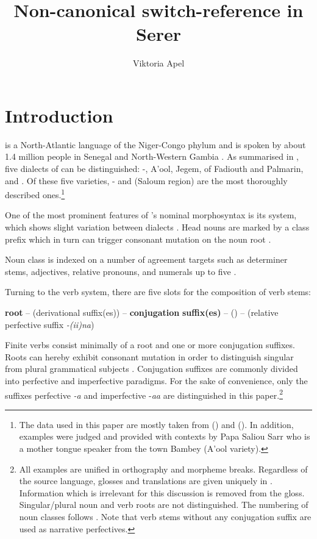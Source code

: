 \documentclass[output=paper
,newtxmath
,modfonts
,nonflat]{langsci/langscibook}
\title{Non-canonical switch-reference in Serer}
\author{Viktoria Apel\affiliation{Humboldt-Universität zu Berlin}}
\begin{document}
\maketitle

\section{Introduction}

 is a North-Atlantic language of the Niger-Congo phylum \citep{Segerer2016} and is spoken by about 1.4 million people in Senegal and North-Western Gambia \citep{SimonsFenning2017}. As summarised in \citet[4]{Renaudier2012}, five dialects of  can be distinguished: -,  A’ool,  Jegem,  of Fadiouth and Palmarin, and  . Of these five varieties, - and   (Saloum region) are the most thoroughly described ones.\footnote{The data used in this paper are mostly taken from \citet{Faye1979} () and \citet{Renaudier2012} (). In addition, examples were judged and provided with contexts by Papa Saliou Sarr who is a mother tongue speaker from the town Bambey (A’ool variety).}

One of the most prominent features of ’s nominal morphosyntax is its  system, which shows slight variation between dialects \citep[see][]{Renaudier2015}. Head nouns are marked by a class prefix which in turn can trigger consonant mutation on the noun root \citep{Faye05,McLaughlin94,McLaughlin00,Merrill14,Pozdniakov2006}.

Noun class is indexed on a number of agreement targets such as determiner stems, adjectives, relative pronouns, and numerals up to five \citep[493]{Renaudier2015}.

Turning to the verb system, there are five slots for the composition of verb stems:

\ea\label{ex:apel:1}
\glt \textbf{root} – (derivational suffix(es)) – \textbf{conjugation} \textbf{suffix(es)} –   () – (relative perfective suffix \textit{-(ii)na})
\z

Finite verbs consist minimally of a root and one or more conjugation suffixes. Roots can hereby exhibit consonant mutation in order to distinguish singular from plural grammatical subjects \citep{McLaughlin94,McLaughlin00}. Conjugation suffixes are commonly divided into perfective and imperfective paradigms. For the sake of convenience, only the suffixes perfective \textit{-a}  and imperfective -\textit{aa}  are distinguished in this paper.\footnote{All examples are unified in orthography and morpheme breaks. Regardless of the source language, glosses and translations are given uniquely in . Information which is irrelevant for this discussion is removed from the gloss. Singular/plural noun and verb roots are not distinguished. The numbering of noun classes follows \citet[118]{Faye1979}. Note that verb stems without any conjugation suffix are used as narrative perfectives.} 
\end{document}
